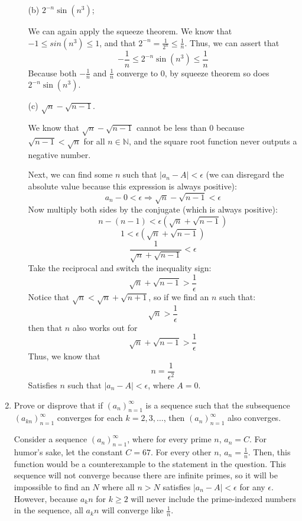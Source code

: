 \documentclass[11pt]{article}
\begin{document}
\begin{enumerate}
\begin{itemize}
\item[(b)] $2^{-n} \sin(n^3)$;

\medskip
We can again apply the squeeze theorem. We know that $-1 \leq sin(n^3) \leq 1$, and that $2^{-n} = \frac{1}{2^n} \leq \frac{1}{n}$. Thus, we can assert that 
\[-\frac{1}{n} \leq 2^{-n} \sin(n^3) \leq \frac{1}{n} \]
Because both $-\frac{1}{n}$ and $\frac{1}{n}$ converge to $0$, by squeeze theorem so does $2^{-n} \sin(n^3)$.

\rightline{$\Box$}

\item[(c)] $\sqrt{n} - \sqrt{n-1}$.

\medskip
We know that $\sqrt{n} - \sqrt{n-1}$ cannot be less than $0$ because $\sqrt{n-1} < \sqrt{n}$ for all $n\in\mathbb{N}$, and the square root function never outputs a negative number. 

Next, we can find some $n$ such that $|a_n - A| < \epsilon $ (we can disregard the absolute value because this expression is always positive):
\[a_n - 0 < \epsilon \Rightarrow \sqrt{n} - \sqrt{n-1} < \epsilon \]
Now multiply both sides by the conjugate (which is always positive):
\[n-(n-1) < \epsilon(\sqrt{n} + \sqrt{n-1} )\]
\[ 1 < \epsilon(\sqrt{n} + \sqrt{n-1} )\]
\[\frac{1}{\sqrt{n} + \sqrt{n-1} } < \epsilon\]
Take the reciprocal and switch the inequality sign:
\[ \sqrt{n} + \sqrt{n-1}  > \frac{1}{\epsilon}\]
Notice that $\sqrt{n} < \sqrt{n}+\sqrt{n+1}  $, so if we find an $n$ such that:
\[ \sqrt{n}  > \frac{1}{\epsilon}\]
then that $n$ also works out for 
\[ \sqrt{n} + \sqrt{n-1}  > \frac{1}{\epsilon}\] 
Thus, we know that 
\[ n = \frac{1}{\epsilon^2} \]
Satisfies $n$ such that $|a_n - A| < \epsilon $, where $A = 0$. 

\rightline{$\Box$}



\end{itemize}


\item
Prove or disprove that if $(a_n)_{n=1}^\infty$ is a sequence such that the subsequence $(a_{kn})_{n=1}^\infty$ converges for each $k = 2, 3, \dots$, then $(a_n)_{n=1}^\infty$ also converges.

Consider a sequence $(a_n)_{n=1}^\infty$, where for every prime $n$, $a_n = C$. For humor's sake, let the constant $C = 67$.  For every other $n$, $a_n = \frac{1}{n}$. Then, this function would be a counterexample to the statement in the question. This sequence will not converge because there are infinite primes, so it will be impossible to find an $N$ where all $n>N$ satisfies $|a_n - A| < \epsilon $ for any $\epsilon$. However, because $a_kn$ for $k \geq2$ will never include the prime-indexed numbers in the sequence, all $a_kn$ will converge like $\frac{1}{n}$.

\end{enumerate}
\end{document}
